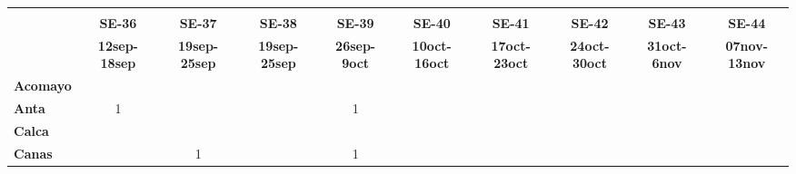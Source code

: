 \begin{tabular}{lccccccccc}
	\textbf{}              & \multicolumn{1}{l}{}                        & \multicolumn{1}{l}{}      & \multicolumn{1}{l}{}                         & \multicolumn{1}{l}{}                         & \multicolumn{1}{l}{}                         & \multicolumn{1}{l}{}                        & \multicolumn{1}{l}{}                         & \multicolumn{1}{l}{}                         & \multicolumn{1}{l}{}     \\
	\textbf{}                                    & \textbf{SE-36}                   & \textbf{SE-37}                             
	& \textbf{SE-38}                             & \textbf{SE-39}                               & \textbf{SE-40}                               & \textbf{SE-41}                               & \textbf{SE-42}                               & \textbf{SE-43}                   & \textbf{SE-44}   \\
	\textbf{}            & \textbf{12sep-18sep} & \textbf{19sep-25sep} & \textbf{19sep-25sep} & \textbf{26sep-9oct} & \textbf{10oct-16oct} & \textbf{17oct-23oct} & \textbf{24oct-30oct}  & \textbf{31oct-6nov}   & \textbf{07nov-13nov}\\
	\textbf{Acomayo}                                                              & \cellcolor[HTML]{FCC46C}                & \cellcolor[HTML]{FCC46C}                   & \cellcolor[HTML]{FCC46C}         & \cellcolor[HTML]{FCC46C}                & \cellcolor[HTML]{FCC46C}                   & \cellcolor[HTML]{FCC46C}         & \cellcolor[HTML]{FCC46C}                & \cellcolor[HTML]{FCC46C}  			       & \cellcolor[HTML]{FCC46C}\\
	\textbf{Anta}                                                                 & 1                                       & \cellcolor[HTML]{FCC46C}                   & \cellcolor[HTML]{FCC46C}         & 1                   					& \cellcolor[HTML]{FCC46C}                   & \cellcolor[HTML]{FCC46C}         & \cellcolor[HTML]{FCC46C} 			    & \cellcolor[HTML]{FCC46C} 				   & \cellcolor[HTML]{FCC46C}\\
	\textbf{Calca}      				       & \cellcolor[HTML]{FCC46C}         & \cellcolor[HTML]{FCC46C}                & \cellcolor[HTML]{FCC46C}                   & \cellcolor[HTML]{FCC46C}         & \cellcolor[HTML]{FCC46C}                & \cellcolor[HTML]{FCC46C}                   & \cellcolor[HTML]{FCC46C}  		  & \cellcolor[HTML]{FCC46C}                & \cellcolor[HTML]{FCC46C} \\
	\textbf{Canas}                             & \cellcolor[HTML]{FCC46C}         & 1              &\cellcolor[HTML]{FCC46C}                  &1                     

\end{tabular}
